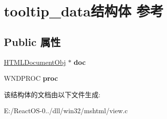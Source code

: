 \hypertarget{structtooltip__data}{}\section{tooltip\+\_\+data结构体 参考}
\label{structtooltip__data}
\subsection*{Public 属性}
\begin{DoxyCompactItemize}
\item 
\mbox{\label{structtooltip__data_a5ec770e8e222cdae5320870c92fd33c8}} 
\hyperlink{struct_h_t_m_l_document_obj}{H\+T\+M\+L\+Document\+Obj} $\ast$ {\bfseries doc}
\item 
\mbox{\label{structtooltip__data_a5900bc90773cd4dbf8b5386685e7c454}} 
W\+N\+D\+P\+R\+OC {\bfseries proc}
\end{DoxyCompactItemize}


该结构体的文档由以下文件生成\+:\begin{DoxyCompactItemize}
\item 
E\+:/\+React\+O\+S-\/0../dll/win32/mshtml/view.\+c\end{DoxyCompactItemize}

